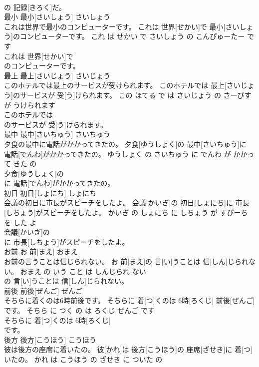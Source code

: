 \documentclass[8pt]{extreport}
\begin{document}
\begin{CJK}{UTF8}{min}
\\	の 記録[きろく]だ。			
\\	最小	最小[さいしょう]	さいしょう	
\\	これは世界で最小のコンピューターです。	これは 世界[せかい]で 最小[さいしょう]のコンピューターです。	これ は せかい で さいしょう の こんぴゅーたー です	
\\	これは 世界[せかい]で
\\	のコンピューターです。			
\\	最上	最上[さいじょう]	さいじょう	
\\	このホテルでは最上のサービスが受けられます。	このホテルでは 最上[さいじょう]のサービスが 受[う]けられます。	この ほてる で は さいじょう の さーびす が うけられます	
\\	このホテルでは
\\	のサービスが 受[う]けられます。			
\\	最中	最中[さいちゅう]	さいちゅう	
\\	夕食の最中に電話がかかってきたの。	夕食[ゆうしょく]の 最中[さいちゅう]に 電話[でんわ]がかかってきたの。	ゆうしょく の さいちゅう に でんわ が かかって きた の	
\\	夕食[ゆうしょく]の
\\	に 電話[でんわ]がかかってきたの。			
\\	初日	初日[しょにち]	しょにち	
\\	会議の初日に市長がスピーチをしたよ。	会議[かいぎ]の 初日[しょにち]に 市長[しちょう]がスピーチをしたよ。	かいぎ の しょにち に しちょう が すぴーち を した よ	
\\	会議[かいぎ]の
\\	に 市長[しちょう]がスピーチをしたよ。			
\\	お前	お 前[まえ]	おまえ	
\\	お前の言うことは信じられない。	お 前[まえ]の 言[い]うことは 信[しん]じられない。	おまえ の いう こと は しんじられ ない	
\\	の 言[い]うことは 信[しん]じられない。			
\\	前後	前後[ぜんご]	ぜんご	
\\	そちらに着くのは6時前後です。	そちらに 着[つ]くのは 6時[ろくじ] 前後[ぜんご]です。	そちら に つく の は ろくじ ぜんご です	
\\	そちらに 着[つ]くのは 6時[ろくじ]
\\	です。			
\\	後方	後方[こうほう]	こうほう	
\\	彼は後方の座席に着いたの。	彼[かれ]は 後方[こうほう]の 座席[ざせき]に 着[つ]いたの。	かれ は こうほう の ざせき に ついた の	

\end{CJK}
\end{document}
